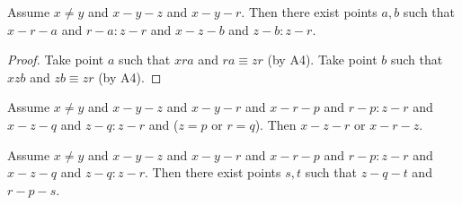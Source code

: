 \documentclass[10pt,a4paper,parskip=half,numbers=endperiod,headings=standardclasses,parskip]{scrbook}
\newcommand{\Cong}[4]{#1 #2 \equiv #3 #4}
\newcommand{\Betw}[3]{#1 #2 #3}
\newcommand{\bprime}{b'}
\newcommand{\bdoubleprime}{b''}
\newcommand{\fresha}{a}
\newcommand{\freshb}{b}
\newcommand{\OFS}[8]{\operatorname{OFS}%
\left(
\begin{smallmatrix}%
#1 & #2 & #3 & #4 \\
#5 & #6 & #7 & #8
\end{smallmatrix}%
\right)%
}
\begin{document}
  \begin{forthel}
    \begin{lemma} %
      Assume $x \neq y$ and $x-y-z$ and $x-y-r$.
      Then there exist points $\fresha,\freshb$ such that $x-r-\fresha$ and $r-\fresha : z-r$ and $x-z-\freshb$ and $z-\freshb : z-r$.
    \end{lemma}
    \begin{proof}
      Take point $a$ such that $\Betw{x}{r}{a}$ and $\Cong{r}{a}{z}{r}$ (by A4).
      Take point $b$ such that $\Betw{x}{z}{b}$ and $\Cong{z}{b}{z}{r}$ (by A4).
    \end{proof}



    \begin{lemma} %
      Assume $x \neq y$ and $x-y-z$ and $x-y-r$ and $x-r-p$ and $r-p : z-r$ and $x-z-q$ and $z-q : z-r$ and ($z = p$ or $r = q$). Then $x-z-r$ or $x-r-z$.
    \end{lemma}

    \begin{lemma} %
      Assume $x \neq y$ and $x-y-z$ and $x-y-r$ and $x-r-p$ and $r-p : z-r$ and $x-z-q$ and $z-q : z-r$. Then there exist points $s,t$ such that $z-q-t$ and $r-p-s$.
    \end{lemma}




  \end{forthel}
\end{document}
